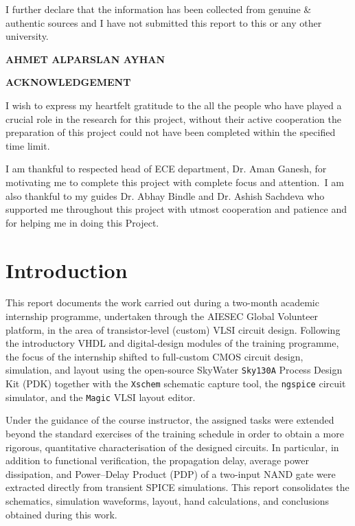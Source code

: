 \documentclass[11pt,a4paper]{article}
\begin{document}
\vspace{0.4cm}
\noindent
I further declare that the information has been collected from genuine \& authentic sources and I have not submitted this report to this or any other university.

\vspace{1.5cm}
\begin{flushright}
\textbf{AHMET ALPARSLAN AYHAN}
\end{flushright}

\newpage

\begin{center}
{\Large \bfseries ACKNOWLEDGEMENT}
\end{center}
\vspace{0.5cm}
\noindent
I wish to express my heartfelt gratitude to the all the people who have played a crucial role in the research for this project, without their active cooperation the preparation of this project could not have been completed within the specified time limit.

\vspace{0.3cm}
\noindent
I am thankful to respected head of ECE department, Dr. Aman Ganesh, for motivating me to complete this project with complete focus and attention. I am also thankful to my guides Dr. Abhay Bindle and Dr. Ashish Sachdeva who supported me throughout this project with utmost cooperation and patience and for helping me in doing this Project.

\newpage

\tableofcontents
\newpage

\section{Introduction}
This report documents the work carried out during a two-month academic
internship programme, undertaken through the AIESEC Global Volunteer
platform, in the area of transistor-level (custom) VLSI circuit design.
Following the introductory VHDL and digital-design modules of the training
programme, the focus of the internship shifted to full-custom CMOS circuit
design, simulation, and layout using the open-source SkyWater \texttt{Sky130A}
Process Design Kit (PDK) together with the \texttt{Xschem} schematic
capture tool, the \texttt{ngspice} circuit simulator, and the \texttt{Magic}
VLSI layout editor.

Under the guidance of the course instructor, the assigned tasks were
extended beyond the standard exercises of the training schedule in order to
obtain a more rigorous, quantitative characterisation of the designed
circuits. In particular, in addition to functional verification, the
propagation delay, average power dissipation, and Power--Delay Product
(PDP) of a two-input NAND gate were extracted directly from transient
SPICE simulations. This report consolidates the schematics, simulation
waveforms, layout, hand calculations, and conclusions obtained during this
work.
\end{document}
